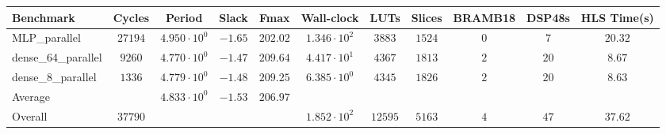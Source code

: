 \begin{tabular}{|l|c|c|c|c|c|c|c|c|c|c|}
\hline
Benchmark           & Cycles    & Period                 & Slack     & Fmax       & Wall-clock             & LUTs      & Slices   & BRAMB18 & DSP48s & HLS Time(s) \\
\hline
MLP\_parallel       & $ 27194 $ & $ 4.950 \cdot 10^{0} $ & $ -1.65 $ & $ 202.02 $ & $ 1.346 \cdot 10^{2} $ & $ 3883  $ & $ 1524 $ & $ 0   $ & $ 7  $ & $ 20.32   $ \\
dense\_64\_parallel & $ 9260  $ & $ 4.770 \cdot 10^{0} $ & $ -1.47 $ & $ 209.64 $ & $ 4.417 \cdot 10^{1} $ & $ 4367  $ & $ 1813 $ & $ 2   $ & $ 20 $ & $ 8.67    $ \\
dense\_8\_parallel  & $ 1336  $ & $ 4.779 \cdot 10^{0} $ & $ -1.48 $ & $ 209.25 $ & $ 6.385 \cdot 10^{0} $ & $ 4345  $ & $ 1826 $ & $ 2   $ & $ 20 $ & $ 8.63    $ \\
\hline
Average             & $       $ & $ 4.833 \cdot 10^{0} $ & $ -1.53 $ & $ 206.97 $ & $                    $ & $       $ & $      $ & $     $ & $    $ & $         $ \\
\hline
Overall             & $ 37790 $ & $                    $ & $       $ & $        $ & $ 1.852 \cdot 10^{2} $ & $ 12595 $ & $ 5163 $ & $ 4   $ & $ 47 $ & $ 37.62   $ \\
\hline
\end{tabular}

